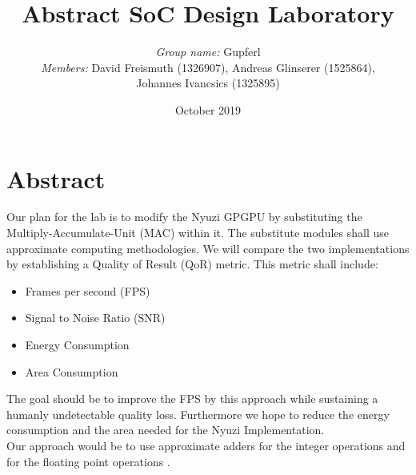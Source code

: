 \documentclass{article}
\title{Abstract SoC Design Laboratory}
\author{\textit{Group name:} Gupferl \\
\textit{Members:} David Freismuth (1326907), Andreas Glinserer (1525864), \\
Johannes Ivancsics (1325895)}
\date{October 2019}
\begin{document}
\maketitle

\section{Abstract}
Our plan for the lab is to modify the Nyuzi GPGPU \cite{NYUZI} by substituting
the Multiply-Accumulate-Unit (MAC) within it. The substitute modules shall use approximate computing methodologies. We will compare the two implementations
by establishing a Quality of Result (QoR) metric. This metric shall include:
\begin{itemize}
    \item Frames per second (FPS)
    \item Signal to Noise Ratio (SNR)
    \item Energy Consumption
    \item Area Consumption
\end{itemize}

The goal should be to improve the FPS by this approach while sustaining a 
humanly undetectable quality loss. Furthermore we hope to reduce
the energy consumption and the area needed for the Nyuzi 
Implementation.\\

Our approach would be to use approximate adders for the integer operations
and for the floating point operations \cite{Mittal:2016:STA:2891449.2893356}.




\end{document}
